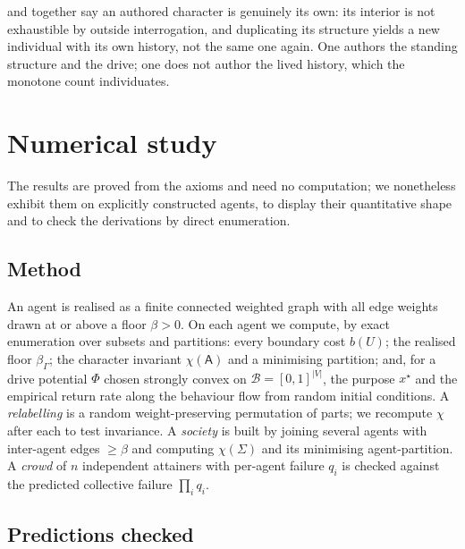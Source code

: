 \documentclass[11pt,twocolumn,a4paper]{article}
\newcommand{\Agent}{\mathsf{A}}
\newcommand{\Self}{\Gamma}          %
\newcommand{\V}{V}
\newcommand{\floorc}{\beta}          %
\newcommand{\Char}{\chi}             %
\newcommand{\Beh}{\mathcal{B}}       %
\newcommand{\Soc}{\Sigma}            %
\newcommand{\abs}[1]{\lvert#1\rvert}
\begin{document}
\begin{remark}
 and  together say an authored
character is genuinely its own: its interior is not exhaustible by outside
interrogation, and duplicating its structure yields a new individual with
its own history, not the same one again. One authors the standing
structure and the drive; one does not author the lived history, which the
monotone count individuates.
\end{remark}

\section{Numerical study}
\label{sec:validation}

The results are proved from the axioms and need no computation; we
nonetheless exhibit them on explicitly constructed agents, to display
their quantitative shape and to check the derivations by direct
enumeration.

\subsection{Method}

An agent is realised as a finite connected weighted graph with all edge
weights drawn at or above a floor $\floorc>0$. On each agent we compute,
by exact enumeration over subsets and partitions: every boundary cost
$b(U)$; the realised floor $\floorc_\Self$; the character invariant
$\Char(\Agent)$ and a minimising partition; and, for a drive potential
$\Phi$ chosen strongly convex on $\Beh=[0,1]^{\abs\V}$, the purpose
$x^\star$ and the empirical return rate along the behaviour flow from
random initial conditions. A \emph{relabelling} is a random
weight-preserving permutation of parts; we recompute $\Char$ after each to
test invariance. A \emph{society} is built by joining several agents with
inter-agent edges $\ge\floorc$ and computing $\Char(\Soc)$ and its
minimising agent-partition. A \emph{crowd} of $n$ independent attainers
with per-agent failure $q_i$ is checked against the predicted collective
failure $\prod_i q_i$.

\subsection{Predictions checked}
\end{document}
